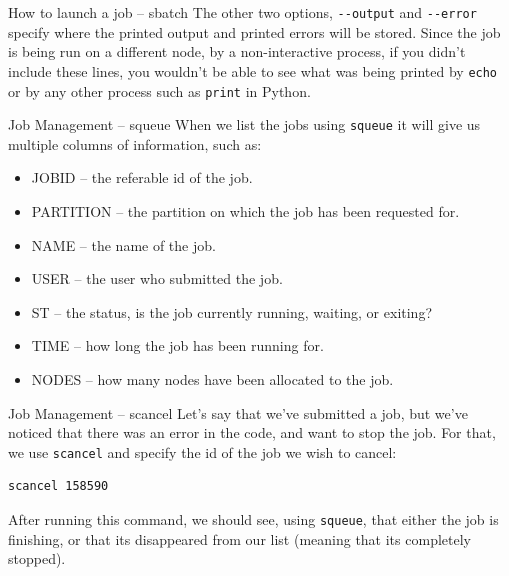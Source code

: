 \documentclass[10pt]{beamer}
\begin{document}
\begin{frame}[label={sec:org26fe2e1},fragile]{How to launch a job -- sbatch}
 The other two options, \texttt{-{}-output} and \texttt{-{}-error} specify where the printed output and
printed errors will be stored. Since the job is being run on a different node,
by a non-interactive process, if you didn't include these lines, you wouldn't be
able to see what was being printed by \texttt{echo} or by any other process such as \texttt{print}
in Python.
\end{frame}

\begin{frame}[label={sec:org946d5b8},fragile]{Job Management -- squeue}
 When we list the jobs using \texttt{squeue} it will give us multiple columns of
information, such as:

\begin{itemize}
\item JOBID -- the referable id of the job.
\item PARTITION -- the partition on which the job has been requested for.
\item NAME -- the name of the job.
\item USER -- the user who submitted the job.
\item ST -- the status, is the job currently running, waiting, or exiting?
\item TIME -- how long the job has been running for.
\item NODES -- how many nodes have been allocated to the job.
\end{itemize}
\end{frame}

\begin{frame}[label={sec:orgb0cfbb2},fragile]{Job Management -- scancel}
 Let's say that we've submitted a job, but we've noticed that there was an error
in the code, and want to stop the job. For that, we use \texttt{scancel} and specify the
id of the job we wish to cancel:

\begin{verbatim}
scancel 158590
\end{verbatim}

After running this command, we should see, using \texttt{squeue}, that either the job is
finishing, or that its disappeared from our list (meaning that its completely
stopped).
\end{frame}
\end{document}

